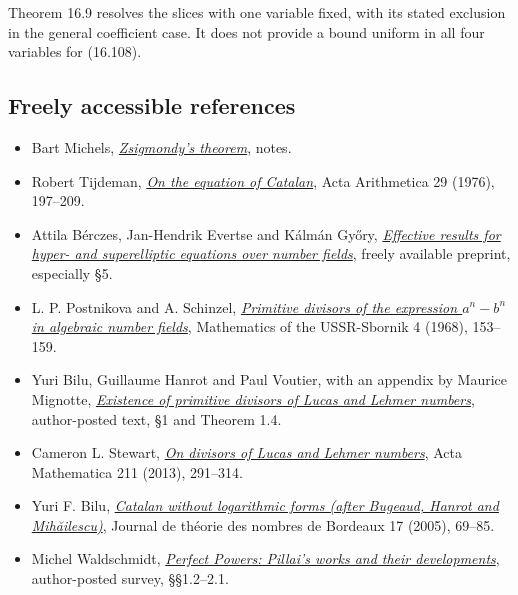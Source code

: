 \documentclass[
  11pt,
  a4paper,
]{article}
\providecommand{\tightlist}{%
  \setlength{\itemsep}{0pt}\setlength{\parskip}{0pt}}
\begin{document}
Theorem 16.9 resolves the slices with one variable fixed, with its
stated exclusion in the general coefficient case. It does not provide a
bound uniform in all four variables for (16.108).

\subsection{Freely accessible
references}\label{freely-accessible-references}

\begin{itemize}
\tightlist
\item
  Bart Michels,
  \href{https://bartmichels.github.io/files/zsigmondy_en.pdf}{\emph{Zsigmondy's
  theorem}}, notes.
\item
  Robert Tijdeman,
  \href{https://matwbn.icm.edu.pl/ksiazki/aa/aa29/aa2929.pdf}{\emph{On
  the equation of Catalan}}, Acta Arithmetica 29 (1976), 197--209.
\item
  Attila Bérczes, Jan-Hendrik Evertse and Kálmán Győry,
  \href{https://arxiv.org/abs/1301.7168}{\emph{Effective results for
  hyper- and superelliptic equations over number fields}}, freely
  available preprint, especially §5.
\item
  L. P. Postnikova and A. Schinzel,
  \href{https://www.mathnet.ru/php/getFT.phtml?jrnid=sm&paperid=3975&what=fullteng}{\emph{Primitive
  divisors of the expression \(a^n-b^n\) in algebraic number fields}},
  Mathematics of the USSR-Sbornik 4 (1968), 153--159.
\item
  Yuri Bilu, Guillaume Hanrot and Paul Voutier, with an appendix by
  Maurice Mignotte,
  \href{https://www.researchgate.net/profile/Paul_Voutier/publication/2397582_Existence_of_Primitive_Divisors_of_Lucas_and_Lehmer_Numbers/links/559999c308ae99aa62cc6983/Existence-of-Primitive-Divisors-of-Lucas-and-Lehmer-Numbers.pdf?origin=publication_detail}{\emph{Existence
  of primitive divisors of Lucas and Lehmer numbers}}, author-posted
  text, §1 and Theorem 1.4.
\item
  Cameron L. Stewart,
  \href{https://uwaterloo.ca/pure-mathematics/sites/default/files/uploads/documents/s11511-013-0105-y.pdf}{\emph{On
  divisors of Lucas and Lehmer numbers}}, Acta Mathematica 211 (2013),
  291--314.
\item
  Yuri F. Bilu,
  \href{https://www.numdam.org/article/JTNB_2005__17_1_69_0.pdf}{\emph{Catalan
  without logarithmic forms (after Bugeaud, Hanrot and Mihăilescu)}},
  Journal de théorie des nombres de Bordeaux 17 (2005), 69--85.
\item
  Michel Waldschmidt,
  \href{https://webusers.imj-prg.fr/~michel.waldschmidt/articles/pdf/PerfectPowers.pdf}{\emph{Perfect
  Powers: Pillai's works and their developments}}, author-posted survey,
  §§1.2--2.1.
\end{itemize}
\end{document}
